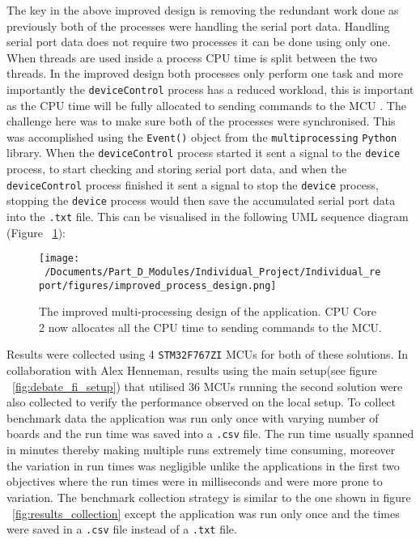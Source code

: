 The key in the above improved design is removing the redundant work done as previously both of the processes were handling the serial port data. Handling serial port data does not require two processes it can be done using only one. When threads are used inside a process CPU time is split between the two threads. In the improved design both processes only perform one task and more importantly the \texttt{deviceControl} process has a reduced workload, this is important as the CPU time will be fully allocated to sending commands to the MCU . The challenge here was to make sure both of the processes were synchronised. This was accomplished using the \texttt{Event()} object from the \texttt{multiprocessing} \texttt{Python} library. When the \texttt{deviceControl} process started it sent a signal to the \texttt{device} process, to start checking and storing serial port data, and when the \texttt{deviceControl} process finished it sent a signal to stop the \texttt{device} process, stopping the \texttt{device} process would then save the accumulated serial port data into the \texttt{.txt} file. This can be visualised in the following UML sequence diagram (Figure ~\ref{fig:improved_application_design}):

\begin{figure}[htbp] %
	\centering
	\texttt{[image: ~/Documents/Part\_D\_Modules/Individual\_Project/Individual\_report/figures/improved\_process\_design.png]} %
	\caption{The improved multi-processing design of the application. CPU Core 2 now allocates all the CPU time to sending commands to the MCU.}
	\label{fig:improved_application_design} %
\end{figure}

Results were collected using 4 \texttt{STM32F767ZI} MCUs for both of these solutions. In collaboration with Alex Henneman, results using the main setup(see figure ~\ref{fig:debate_fi_setup}) that utilised 36 MCUs running the second solution were also collected to verify the performance observed on the local setup. To collect benchmark data the application was run only once with varying number of boards and the run time was saved into a \texttt{.csv} file. The run time usually spanned in minutes thereby making multiple runs extremely time consuming, moreover the variation in run times was negligible unlike the applications in the first two objectives where the run times were in milliseconds and were more prone to variation. The benchmark collection strategy is similar to the one shown in figure ~\ref{fig:results_collection} except the application was run only once and the times were saved in a \texttt{.csv} file instead of a \texttt{.txt} file. 

